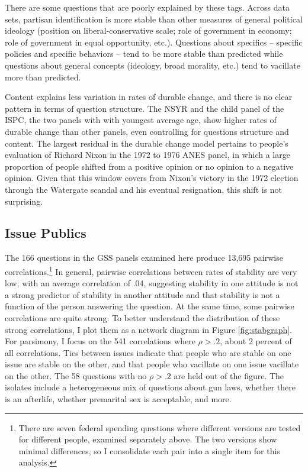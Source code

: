 \documentclass[12pt,]{article}
\begin{document}
There are some questions that are poorly explained by these tags. Across data sets, partisan identification is more stable than other measures of general political ideology (position on liberal-conservative scale; role of government in economy; role of government in equal opportunity, etc.). Questions about specifics -- specific policies and specific behaviors -- tend to be more stable than predicted while questions about general concepts (ideology, broad morality, etc.) tend to vacillate more than predicted.

Content explains less variation in rates of durable change, and there is no clear pattern in terms of question structure. The NSYR and the child panel of the ISPC, the two panels with with youngest average age, show higher rates of durable change than other panels, even controlling for questions structure and content. The largest residual in the durable change model pertains to people's evaluation of Richard Nixon in the 1972 to 1976 ANES panel, in which a large proportion of people shifted from a positive opinion or no opinion to a negative opinion. Given that this window covers from Nixon's victory in the 1972 election through the Watergate scandal and his eventual resignation, this shift is not surprising.

\hypertarget{issue-publics}{%
\subsection{Issue Publics}\label{issue-publics}}

The 166 questions in the GSS panels examined here produce 13,695 pairwise correlations.\footnote{There are seven federal spending questions where different versions are tested for different people, examined separately above. The two versions show minimal differences, so I consolidate each pair into a single item for this analysis.} In general, pairwise correlations between rates of stability are very low, with an average correlation of .04, suggesting stability in one attitude is not a strong predictor of stability in another attitude and that stability is not a function of the person answering the question. At the same time, some pairwise correlations are quite strong. To better understand the distribution of these strong correlations, I plot them as a network diagram in Figure \ref{fig:stabgraph}. For parsimony, I focus on the 541 correlations where \(\rho > .2\), about 2 percent of all correlations. Ties between issues indicate that people who are stable on one issue are stable on the other, and that people who vacillate on one issue vacillate on the other. The 58 questions with no \(\rho > .2\) are held out of the figure. The isolates include a heterogeneous mix of questions about gun laws, whether there is an afterlife, whether premarital sex is acceptable, and more.
\end{document}
